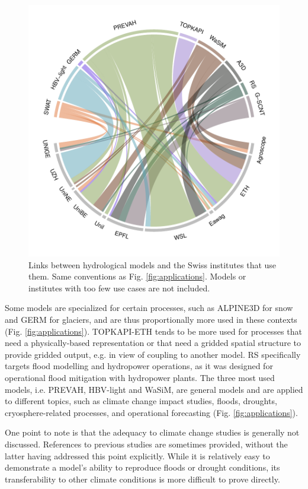 \documentclass[10pt,a4paper]{article}
\begin{document}
\begin{figure}[htb]
	\begin{center}
		\includegraphics[width=0.70\columnwidth]{figures/chord_diagram_institutes}
		\caption{{Links between hydrological models and the Swiss institutes that use them. Same conventions as Fig. \ref{fig:applications}. Models or institutes with too few use cases are not included.
		{\label{fig:model_institutes}}
		}}
	\end{center}
\end{figure}

Some models are specialized for certain processes, such as ALPINE3D for snow and GERM for glaciers, and are thus proportionally more used in these contexts (Fig. \ref{fig:applications}). TOPKAPI-ETH tends to be more used for processes that need a physically-based representation or that need a gridded spatial structure to provide gridded output, e.g. in view of coupling to another model. RS specifically targets flood modelling and hydropower operations, as it was designed for operational flood mitigation with hydropower plants. The three most used models, i.e. PREVAH, HBV-light and WaSiM, are general models and are applied to different topics, such as climate change impact studies, floods, droughts, cryosphere-related processes, and operational forecasting (Fig. \ref{fig:applications}).

One point to note is that the adequacy to climate change studies is generally not discussed. References to previous studies are sometimes provided, without the latter having addressed this point explicitly. While it is relatively easy to demonstrate a model's ability to reproduce floods or drought conditions, its transferability to other climate conditions is more difficult to prove directly. 
\end{document}
